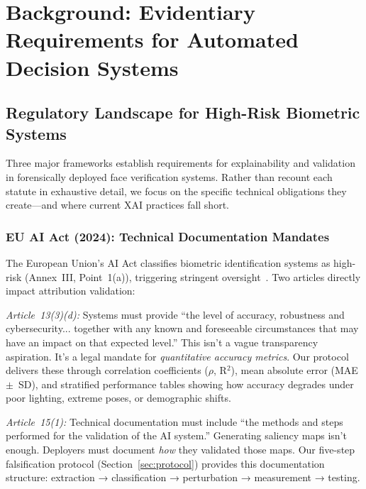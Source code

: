 
\section{Background: Evidentiary Requirements for Automated Decision Systems}
\label{sec:background}

\subsection{Regulatory Landscape for High-Risk Biometric Systems}

Three major frameworks establish requirements for explainability and validation in forensically deployed face verification systems. Rather than recount each statute in exhaustive detail, we focus on the specific technical obligations they create—and where current XAI practices fall short.

\subsubsection{EU AI Act (2024): Technical Documentation Mandates}

The European Union's AI Act classifies biometric identification systems as high-risk (Annex~III, Point~1(a)), triggering stringent oversight~\cite{euaiact2024}. Two articles directly impact attribution validation:

\textit{Article~13(3)(d):} Systems must provide ``the level of accuracy, robustness and cybersecurity... together with any known and foreseeable circumstances that may have an impact on that expected level.'' This isn't a vague transparency aspiration. It's a legal mandate for \textit{quantitative accuracy metrics}. Our protocol delivers these through correlation coefficients ($\rho$, R$^2$), mean absolute error (MAE~$\pm$~SD), and stratified performance tables showing how accuracy degrades under poor lighting, extreme poses, or demographic shifts.

\textit{Article~15(1):} Technical documentation must include ``the methods and steps performed for the validation of the AI system.'' Generating saliency maps isn't enough. Deployers must document \textit{how} they validated those maps. Our five-step falsification protocol (Section~\ref{sec:protocol}) provides this documentation structure: extraction → classification → perturbation → measurement → testing.

